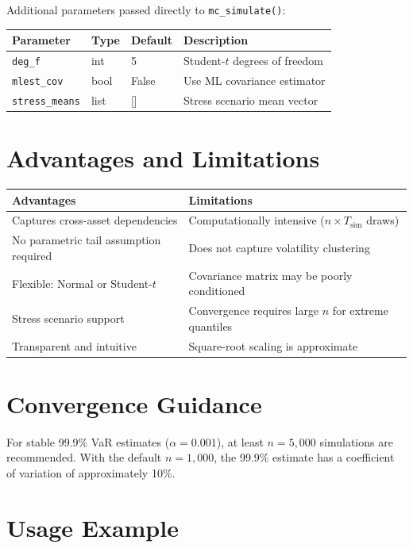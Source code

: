 \documentclass[11pt, a4paper]{article}
\begin{document}
\medskip
\noindent Additional parameters passed directly to \texttt{mc\_simulate()}:

\begin{tabular}{llll}
\toprule
Parameter & Type & Default & Description \\
\midrule
\texttt{deg\_f}      & int   & 5    & Student-$t$ degrees of freedom \\
\texttt{mlest\_cov}  & bool  & False& Use ML covariance estimator \\
\texttt{stress\_means} & list & []  & Stress scenario mean vector \\
\bottomrule
\end{tabular}

\section{Advantages and Limitations}

\begin{tabular}{p{6cm} p{8cm}}
\toprule
Advantages & Limitations \\
\midrule
Captures cross-asset dependencies & Computationally intensive ($n \times T_{\text{sim}}$ draws) \\
No parametric tail assumption required & Does not capture volatility clustering \\
Flexible: Normal or Student-$t$ & Covariance matrix may be poorly conditioned \\
Stress scenario support & Convergence requires large $n$ for extreme quantiles \\
Transparent and intuitive & Square-root scaling is approximate \\
\bottomrule
\end{tabular}

\section{Convergence Guidance}

For stable 99.9\% VaR estimates ($\alpha = 0.001$), at least $n = 5{,}000$
simulations are recommended. With the default $n = 1{,}000$, the 99.9\%
estimate has a coefficient of variation of approximately 10\%.

\section{Usage Example}
\end{document}
